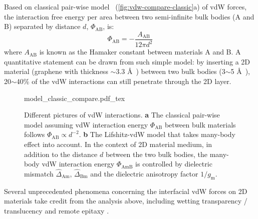 Based on classical pair-wise model~\cite{Hamaker_1937_vdW}
(\autoref{fig:vdw-compare-classic}a) of vdW forces, the interaction
free energy per area  between two semi-infinite
bulk bodies (A and B) separated by distance $d$, $\Phi_{\mathrm{AB}}$, is:
\begin{equation}
  \label{eq:vdw-hamaker-res}
  \Phi_{\mathrm{AB}} = - \frac{A_{\mathrm{AB}}}{12 \pi d^{2}}
\end{equation}
where $A_{\mathrm{AB}}$ is known as the Hamaker constant between materials A and B.
%
A quantitative statement can be drawn from such simple model: by
inserting a 2D material (\eg graphene with thickness $\sim{}$3.3
\AA{}~\cite{Shearer_2016}) between two bulk bodies (3$\sim{}$5
\AA{}~\cite{Israelachvili_2011_book}), 20$\sim{}$40\% of the vdW
interactions can still penetrate through the 2D layer.
\begin{figure}[!htbp]
  \centering
  {model_classic_compare.pdf_tex}
  \caption{\label{fig:vdw-compare-classic}%
    Different pictures of vdW interactions. {\bfseries a} The classical
    pair-wise model assuming vdW interaction energy
    $\Phi_{\mathrm{AB}}$ between bulk materials follows
    $\Phi_{\mathrm{AB}} \propto d^{-2}$. {\bfseries b} The Lifshitz-vdW
    model that takes many-body effect into account. In the context of
    2D material medium, in addition to the distance $d$ between the
    two bulk bodies, the many-body vdW interaction energy
    $\Phi_{\mathrm{AmB}}$ is controlled by dielectric mismatch
    $\hat{\Delta}_{\mathrm{Am}}$, $\hat{\Delta}_{\mathrm{Bm}}$ and the
    dielectric anisotropy factor $1/g_{\mathrm{m}}$.}
\end{figure}
%
Several unprecedented phenomena concerning the interfacial vdW forces
on 2D materials take credit from the analysis above, including wetting
transparency / translucency
\cite{Shih_2012_prl,rafiee_2012_transparency,Gurarslan_2016_screen_MoS2} and remote
epitaxy \cite{Kim_2017_remote_epi_Gr,Kong_2018_pol}.

